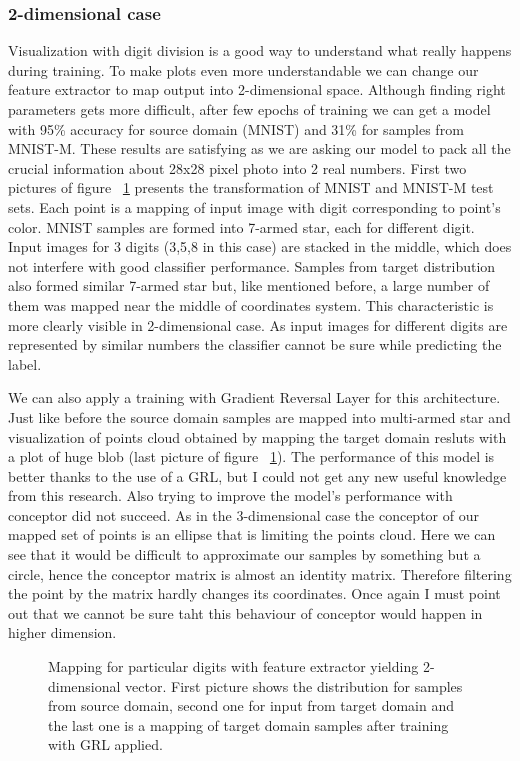 \documentclass{article}
\begin{document}
\subsubsection{2-dimensional case}
\par
Visualization with digit division is a good way to understand what really happens during training. To make plots even more understandable we can change our feature extractor to map output into 2-dimensional space. Although finding right parameters gets more difficult, after few epochs of training we can get a model with 95\% accuracy for source domain (MNIST) and 31\% for samples from MNIST-M. These results are satisfying as we are asking our model to pack all the crucial information about 28x28 pixel photo into 2 real numbers. First two pictures of figure ~\ref{fig:2D} presents the transformation of MNIST and MNIST-M test sets. Each point is a mapping of input image with digit corresponding to point's color. MNIST samples are formed into 7-armed star, each for different digit. Input images for 3 digits (3,5,8 in this case) are stacked in the middle, which does not interfere with good classifier performance. Samples from target distribution also formed similar 7-armed star but, like mentioned before, a large number of them was mapped near the middle of coordinates system. This characteristic is more clearly visible in 2-dimensional case. As input images for different digits are represented by similar numbers the classifier cannot be sure while predicting the label.
\par
We can also apply a training with Gradient Reversal Layer for this architecture. Just like before the source domain samples are mapped into multi-armed star and visualization of points cloud obtained by mapping the target domain resluts with a plot of huge blob (last picture of figure ~\ref{fig:2D}). The performance of this model is better thanks to the use of a GRL, but I could not get any new useful knowledge from this research. Also trying to improve the model's performance with conceptor did not succeed. As in the 3-dimensional case the conceptor of our mapped set of points is an ellipse that is limiting the points cloud. Here we can see that it would be difficult to approximate our samples by something but a circle, hence the conceptor matrix is almost an identity matrix. Therefore filtering the point by the matrix hardly changes its coordinates. Once again I must point out that we cannot be sure taht this behaviour of conceptor would happen in higher dimension.

\begin{figure}[htb]%
\captionsetup[subfigure]{labelformat=empty}
    \centering
    \qquad
    \qquad
    \caption{Mapping for particular digits with feature extractor yielding 2-dimensional vector. First picture shows the distribution for samples from source domain, second one for input from target domain and the last one is a mapping of target domain samples after training with GRL applied.}%
    \label{fig:2D}%
\end{figure}
\end{document}
